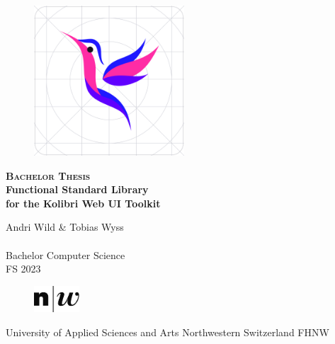 






\begin{titlepage}
\begin{center}

    \begin{figure}[H]
        \centering
        \includegraphics[width=0.50\textwidth]{./frontmatter/pictures/kolibri-logo}
    \end{figure}
    \vspace*{1cm}
    {
      \huge \textsc \bfseries Bachelor Thesis
    }
    \vspace*{1cm}
    {
      \Huge \bfseries \\Functional Standard Library \\for the Kolibri Web UI Toolkit  \\ 
    }
    \vspace{1.5cm}
    {\large 
      Andri Wild \& Tobias Wyss\\

    	~\\
    	Bachelor Computer Science\\
    	\vspace{1.0cm}
    	FS 2023\\
    	\vspace{1.0cm}
    \begin{figure}[h]
        \centering
        \includegraphics[width=0.15\textwidth]{./frontmatter/pictures/fhnw_e_10mm.jpg}
    \end{figure}
    	University of Applied Sciences and Arts Northwestern Switzerland FHNW
        ~\\
    }


\end{center}
\end{titlepage}
